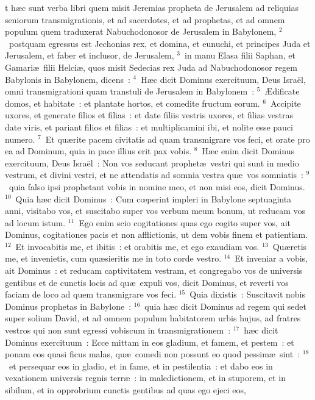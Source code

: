 \bchapter
{}t h\ae c sunt verba libri quem misit Jeremias propheta de Jerusalem ad reliquias seniorum transmigrationis, et ad sacerdotes, et ad prophetas, et ad omnem populum quem traduxerat Nabuchodonosor de Jerusalem in Babylonem,
${}^{2}$~postquam egressus est Jechonias rex, et domina, et eunuchi, et principes Juda et Jerusalem, et faber et inclusor, de Jerusalem,
${}^{3}$~in manu Elasa filii Saphan, et Gamari\ae\ filii Helci\ae , quos misit Sedecias rex Juda ad Nabuchodonosor regem Babylonis in Babylonem, dicens~:
${}^{4}$~H\ae c dicit Dominus exercituum, Deus Isra\"el, omni transmigrationi quam transtuli de Jerusalem in Babylonem~:
${}^{5}$~\AE dificate domos, et habitate~: et plantate hortos, et comedite fructum eorum.
${}^{6}$~Accipite uxores, et generate filios et filias~: et date filiis vestris uxores, et filias vestras date viris, et pariant filios et filias~: et multiplicamini ibi, et nolite esse pauci numero.
${}^{7}$~Et qu\ae rite pacem civitatis ad quam transmigrare vos feci, et orate pro ea ad Dominum, quia in pace illius erit pax vobis.
${}^{8}$~H\ae c enim dicit Dominus exercituum, Deus Isra\"el~: Non vos seducant prophet\ae\ vestri qui sunt in medio vestrum, et divini vestri, et ne attendatis ad somnia vestra qu\ae\ vos somniatis~:
${}^{9}$~quia falso ipsi prophetant vobis in nomine meo, et non misi eos, dicit Dominus.
${}^{10}$~Quia h\ae c dicit Dominus~: Cum cœperint impleri in Babylone septuaginta anni, visitabo vos, et suscitabo super vos verbum meum bonum, ut reducam vos ad locum istum.
${}^{11}$~Ego enim scio cogitationes quas ego cogito super vos, ait Dominus, cogitationes pacis et non afflictionis, ut dem vobis finem et patientiam.
${}^{12}$~Et invocabitis me, et ibitis~: et orabitis me, et ego exaudiam vos.
${}^{13}$~Qu\ae retis me, et invenietis, cum qu\ae sieritis me in toto corde vestro.
${}^{14}$~Et inveniar a vobis, ait Dominus~: et reducam captivitatem vestram, et congregabo vos de universis gentibus et de cunctis locis ad qu\ae\ expuli vos, dicit Dominus, et reverti vos faciam de loco ad quem transmigrare vos feci.
${}^{15}$~Quia dixistis~: Suscitavit nobis Dominus prophetas in Babylone~:
${}^{16}$~quia h\ae c dicit Dominus ad regem qui sedet super solium David, et ad omnem populum habitatorem urbis hujus, ad fratres vestros qui non sunt egressi vobiscum in transmigrationem~:
${}^{17}$~h\ae c dicit Dominus exercituum~: Ecce mittam in eos gladium, et famem, et pestem~: et ponam eos quasi ficus malas, qu\ae\ comedi non possunt eo quod pessim\ae\ sint~:
${}^{18}$~et persequar eos in gladio, et in fame, et in pestilentia~: et dabo eos in vexationem universis regnis terr\ae~: in maledictionem, et in stuporem, et in sibilum, et in opprobrium cunctis gentibus ad quas ego ejeci eos,
